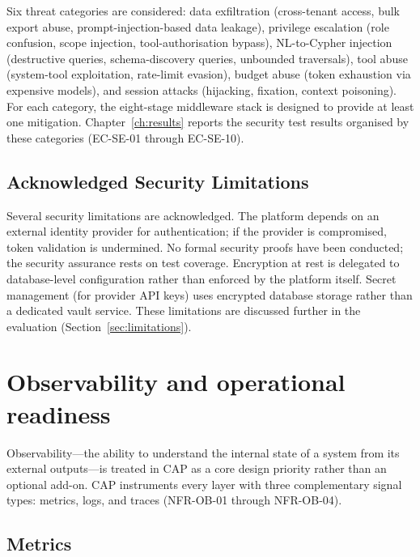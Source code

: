 \documentclass[a4paper,noexaminfo]{sapthesis}
\begin{document}
Six threat categories are considered: data exfiltration (cross-tenant
access, bulk export abuse, prompt-injection-based data leakage), privilege
escalation (role confusion, scope injection, tool-authorisation bypass),
NL-to-Cypher injection (destructive queries, schema-discovery queries,
unbounded traversals), tool abuse (system-tool exploitation, rate-limit
evasion), budget abuse (token exhaustion via expensive models), and session
attacks (hijacking, fixation, context poisoning).  For each category, the
eight-stage middleware stack is designed to provide at least one mitigation.
Chapter~\ref{ch:results} reports the security test results organised by
these categories (EC-SE-01 through EC-SE-10).

\subsection{Acknowledged Security Limitations}

Several security limitations are acknowledged.  The platform depends on an
external identity provider for authentication; if the provider is
compromised, token validation is undermined.  No formal security proofs
have been conducted; the security assurance rests on test coverage.
Encryption at rest is delegated to database-level configuration rather
than enforced by the platform itself.  Secret management (for provider API
keys) uses encrypted database storage rather than a dedicated vault service.
These limitations are discussed further in the evaluation
(Section~\ref{sec:limitations}).


\section{Observability and operational readiness}
\label{sec:observability}

Observability---the ability to understand the internal state of a system
from its external outputs---is treated in CAP as a core design priority
rather than an optional add-on.  CAP
instruments every layer with three complementary signal types: metrics,
logs, and traces (NFR-OB-01 through NFR-OB-04).

\subsection{Metrics}
\end{document}
